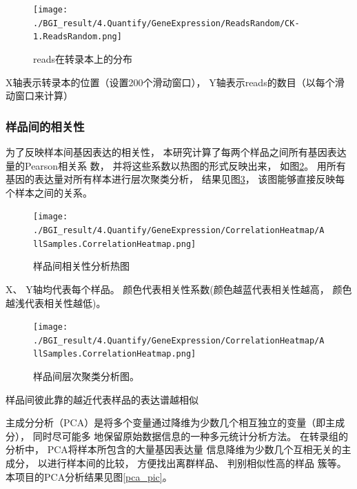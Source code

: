 \documentclass[10pt, oneside,a4paper]{article}
\begin{document}
\begin{figure}[H]
\centering
\texttt{[image: ./BGI\_result/4.Quantify/GeneExpression/ReadsRandom/CK-1.ReadsRandom.png]}
\par
\renewcommand{\figurename}{图}
\caption{reads在转录本上的分布}
\label{readsdis}
\end{figure}
\begin{center}
X轴表示转录本的位置（设置200个滑动窗口）， Y轴表示reads的数目（以每个滑动窗口来计算）
\end{center}

\subsubsection{样品间的相关性}
为了反映样本间基因表达的相关性， 本研究计算了每两个样品之间所有基因表达量的Pearson相关系
数， 并将这些系数以热图的形式反映出来， 如图\ref{cor_pic}。 用所有基因的表达量对所有样本进行层次聚类分析，
结果见图\ref{clus_pic}， 该图能够直接反映每个样本之间的关系。\par

\begin{figure}[H]
\centering
\texttt{[image: ./BGI\_result/4.Quantify/GeneExpression/CorrelationHeatmap/AllSamples.CorrelationHeatmap.png]}
\par
\renewcommand{\figurename}{图}
\caption{样品间相关性分析热图}
\label{cor_pic}
\end{figure}
\begin{center}
X、 Y轴均代表每个样品。 颜色代表相关性系数(颜色越蓝代表相关性越高， 颜色越浅代表相关性越低)。
\end{center}

\begin{figure}[H]
\centering
\texttt{[image: ./BGI\_result/4.Quantify/GeneExpression/CorrelationHeatmap/AllSamples.CorrelationHeatmap.png]}
\par
\renewcommand{\figurename}{图}
\caption{样品间层次聚类分析图。}
\label{clus_pic}
\end{figure}
\begin{center}
样品间彼此靠的越近代表样品的表达谱越相似
\end{center}

主成分分析（PCA）是将多个变量通过降维为少数几个相互独立的变量（即主成分）， 同时尽可能多
地保留原始数据信息的一种多元统计分析方法。 在转录组的分析中， PCA将样本所包含的大量基因表达量
信息降维为少数几个互相无关的主成分， 以进行样本间的比较， 方便找出离群样品、 判别相似性高的样品
簇等。 本项目的PCA分析结果见图\ref{pca_pic}。\par
\end{document}
